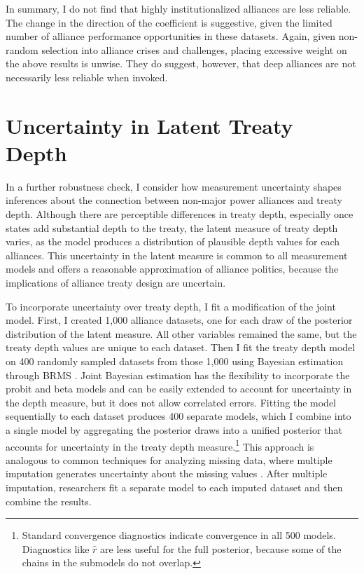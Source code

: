 \documentclass[12pt]{article}
\begin{document}
In summary, I do not find that highly institutionalized alliances are less reliable. 
The change in the direction of the coefficient is suggestive, given the limited number of alliance performance opportunities in these datasets. 
Again, given non-random selection into alliance crises and challenges, placing excessive weight on the above results is unwise. 
They do suggest, however, that deep alliances are not necessarily less reliable when invoked. 



\section{Uncertainty in Latent Treaty Depth} 


In a further robustness check, I consider how measurement uncertainty shapes inferences about the connection between non-major power alliances and treaty depth. 
Although there are perceptible differences in treaty depth, especially once states add substantial depth to the treaty, the latent measure of treaty depth varies, as the model produces a distribution of plausible depth values for each alliances. 
This uncertainty in the latent measure is common to all measurement models and offers a reasonable approximation of alliance politics, because the implications of alliance treaty design are uncertain.  


To incorporate uncertainty over treaty depth, I fit a modification of the joint model. 
First, I created 1,000 alliance datasets, one for each draw of the posterior distribution of the latent measure.
All other variables remained the same, but the treaty depth values are unique to each dataset. 
Then I fit the treaty depth model on 400 randomly sampled datasets from those 1,000 using Bayesian estimation through BRMS \citep{Buerkner2017}. 
Joint Bayesian estimation has the flexibility to incorporate the probit and beta models and can be easily extended to account for uncertainty in the depth measure, but it does not allow correlated errors. 
Fitting the model sequentially to each dataset produces 400 separate models, which I combine into a single model by aggregating the posterior draws into a unified posterior that accounts for uncertainty in the treaty depth measure.\footnote{Standard convergence diagnostics indicate convergence in all 500 models. Diagnostics like $\hat{r}$ are less useful for the full posterior, because some of the chains in the submodels do not overlap.}
This approach is analogous to common techniques for analyzing missing data, where multiple imputation generates uncertainty about the missing values \citep{Hollenbachetal2018imp}.
After multiple imputation, researchers fit a separate model to each imputed dataset and then combine the results. 
\end{document}
